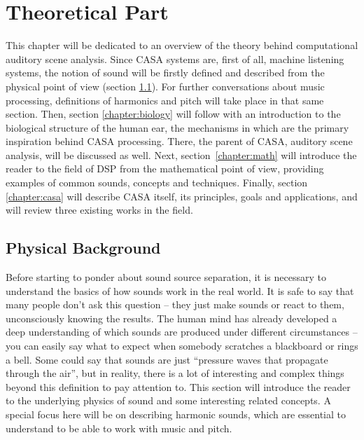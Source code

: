 \chapter{Theoretical Part}\label{chapter:theory}

This chapter will be dedicated to an overview of the theory behind computational auditory scene analysis. Since CASA systems are, first of all, machine listening systems, the notion of sound will be firstly defined and described from the physical point of view (section \ref{chapter:physics}). For further conversations about music processing, definitions of harmonics and pitch will take place in that same section. Then, section \ref{chapter:biology} will follow with an introduction to the biological structure of the human ear, the mechanisms in which are the primary inspiration behind CASA processing. There, the parent of CASA, auditory scene analysis, will be discussed as well. Next, section~\ref{chapter:math} will introduce the reader to the field of DSP from the mathematical point of view, providing examples of common sounds, concepts and techniques. Finally, section \ref{chapter:casa} will describe CASA itself, its principles, goals and applications, and will review three existing works in the field.

\section{Physical Background}\label{chapter:physics}

Before starting to ponder about sound source separation, it is necessary to understand the basics of how sounds work in the real world. It is safe to say that many people don’t ask this question – they just make sounds or react to them, unconsciously knowing the results. The human mind has already developed a deep understanding of which sounds are produced under different circumstances – you can easily say what to expect when somebody scratches a blackboard or rings a bell. Some could say that sounds are just “pressure waves that propagate through the air”, but in reality, there is a lot of interesting and complex things beyond this definition to pay attention to. This section will introduce the reader to the underlying physics of sound and some interesting related concepts. A special focus here will be on describing harmonic sounds, which are essential to understand to be able to work with music and pitch.

